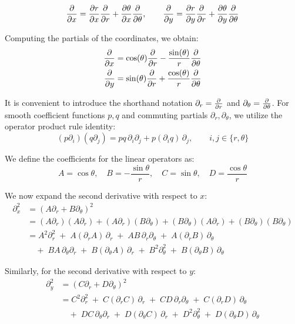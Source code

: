 \documentclass[11pt, letterpaper]{article}
\begin{document}
\begin{equation}
\pdv{x} = \pdv{r}{x} \pdv{r} + \pdv{\theta}{x} \pdv{\theta}, \quad\quad \pdv{y} = \pdv{r}{y} \pdv{r} + \pdv{\theta}{y} \pdv{\theta}
\end{equation}

Computing the partials of the coordinates, we obtain:
\begin{align}
\pdv{x} &= \cos(\theta) \pdv{r} - \frac{\sin(\theta)}{r} \pdv{\theta} \\
\pdv{y} &= \sin(\theta) \pdv{r} + \frac{\cos(\theta)}{r}\pdv{\theta}
\end{align}

It is convenient to introduce the shorthand notation $\partial_{r} = \pdv{r}$ and $\partial_\theta = \pdv{\theta}$. For smooth coefficient functions $p,q$ and commuting partials $\partial_r,\partial_\theta$, we utilize the operator product rule identity:
\begin{equation}
(p\partial_i)(q\partial_j) = p q\,\partial_i\partial_j + p(\partial_i q)\,\partial_j, \qquad i,j\in\{r,\theta\}
\end{equation}

We define the coefficients for the linear operators as:
\begin{equation}
A=\cos\theta,\quad B=-\dfrac{\sin\theta}{r},\quad C=\sin\theta,\quad D=\dfrac{\cos\theta}{r}
\end{equation}

We now expand the second derivative with respect to $x$:
\begin{align*}
\partial_x^2 &= (A\partial_r + B\partial_\theta)^2 \\[4pt]
&= (A\partial_r)(A\partial_r) + (A\partial_r)(B\partial_\theta) + (B\partial_\theta)(A\partial_r) + (B\partial_\theta)(B\partial_\theta)\\[6pt]
&= A^2\partial_r^2 \;+\; A(\partial_r A)\,\partial_r \;+\; AB\,\partial_r\partial_\theta \;+\; A(\partial_r B)\,\partial_\theta \\[4pt]
&\quad +\; BA\,\partial_\theta\partial_r \;+\; B(\partial_\theta A)\,\partial_r \;+\; B^2\partial_\theta^2 \;+\; B(\partial_\theta B)\,\partial_\theta
\end{align*}

Similarly, for the second derivative with respect to $y$:
\begin{align*}
\partial_y^2 &= (C\partial_r + D\partial_\theta)^2 \\[4pt]
&= C^2\partial_r^2 \;+\; C(\partial_r C)\,\partial_r \;+\; CD\,\partial_r\partial_\theta \;+\; C(\partial_r D)\,\partial_\theta \\[4pt]
&\quad +\; DC\,\partial_\theta\partial_r \;+\; D(\partial_\theta C)\,\partial_r \;+\; D^2\partial_\theta^2 \;+\; D(\partial_\theta D)\,\partial_\theta
\end{align*}
\end{document}
